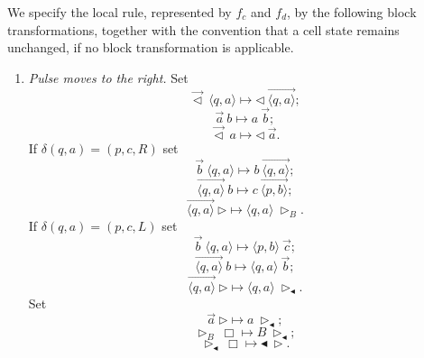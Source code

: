 \documentclass{article}
\theoremstyle{definition}
\begin{document}
We specify the local rule, represented by $f_c$ and $f_d$, by the following block transformations, together with the convention
that a cell state remains unchanged, if no block transformation is applicable.
\begin{enumerate}

\item
\emph{Pulse moves to the right.}
Set
\begin{equation}
\overrightarrow{\lhd} \: \langle q, a \rangle \mapsto \lhd \: \overrightarrow{\langle q, a \rangle};
\label{tr:start-state}
\end{equation}
\begin{equation}
\overrightarrow{a} \: b \mapsto a \: \overrightarrow{b};
\label{tr:down}
\end{equation}
\begin{equation}
\overrightarrow{\lhd} \:a \mapsto \lhd \: \overrightarrow{a}.
\label{tr:start}
\end{equation}
If $\delta(q,a) = (p,c,R)$ set
\begin{equation}
\overrightarrow{b} \: \langle q, a \rangle \mapsto b \:
\overrightarrow{\langle q, a \rangle};
\label{tr:down-to-head}
\end{equation}
\begin{equation}
\overrightarrow{\langle q,a \rangle} \: b \mapsto c \:
\overrightarrow{\langle p, b \rangle};
\label{tr:right-2}
\end{equation}
\begin{equation}
\overrightarrow{\langle q,a \rangle} \: \rhd \mapsto \langle q,a \rangle \:
\rhd_B.
\label{tr:down-state-right-delimiter-blank}
\end{equation}
If $\delta(q,a) = (p,c,L)$ set
\begin{equation}
\overrightarrow{b} \: \langle q, a \rangle \mapsto \langle p, b \rangle \:
\overrightarrow{c};
\label{tr:left-1}
\end{equation}
\begin{equation}
\overrightarrow{\langle q,a \rangle} \: b \mapsto \langle q,a \rangle \:
\overrightarrow{b};
\label{tr:left-no-move}
\end{equation}
\begin{equation}
\overrightarrow{\langle q,a \rangle} \: \rhd \mapsto \langle q,a \rangle \:
\rhd_\blacktriangleleft.
\label{tr:down-state-right-delimiter}
\end{equation}
Set
\begin{equation}
\overrightarrow{a} \: \rhd \mapsto a \: \rhd_\blacktriangleleft;
\label{tr:down-a-rhd}
\end{equation}
\begin{equation}
\rhd_B \: \Box \mapsto B \: \rhd_\blacktriangleleft;
\label{tr:new-blank}
\end{equation}
\begin{equation}
\rhd_\blacktriangleleft \: \Box \mapsto \blacktriangleleft \: \rhd.
\label{tr:reflection-right}
\end{equation}


\end{enumerate}
\end{document}
